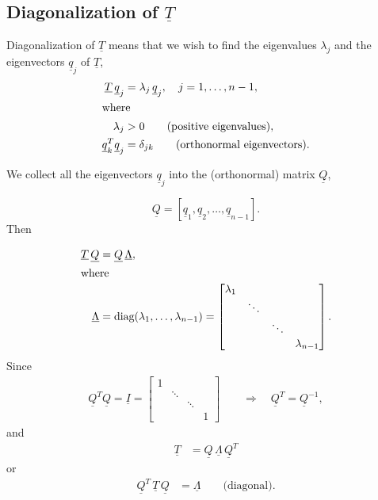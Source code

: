 \documentclass[11pt]{article}
\begin{document}
\subsection{Diagonalization of $\underline{T}$}

Diagonalization of $\underline{T}$ means that we wish to find the 
eigenvalues $\lambda_j$ and the eigenvectors $\underline{q}_j$ 
of $\underline{T}$, 
\begin{align*}
  \underline{T}\, \underline{q}_j &= \lambda_j \,\underline{q}_j, \quad j=1,\ldots,n-1 ,\\
  \intertext{where}
  \lambda_j &> 0 \qquad \text{(positive eigenvalues)}, \\
  \underline{q}_k^T \underline{q}_j &= \delta_{jk} \qquad \text{(orthonormal eigenvectors)}.
\end{align*}

We collect all the eigenvectors $\underline{q}_j$ into the (orthonormal) 
matrix $\underline{Q}$,

\begin{equation*}
  \underline{Q} = [\underline{q}_1, \underline{q}_2,\ldots,\underline{q}_{n-1}].
\end{equation*}
Then

\begin{align*}
  \underline{T} \, \underline{Q} &= \underline{Q} \, \underline{\Lambda}, \\
  \intertext{where}
  \underline{\Lambda} &= \text{diag}(\lambda_1, \ldots, \lambda_{n-1}) = 
  \begin{bmatrix}
    \lambda_1 & & & \\
     & \ddots & & \\
    & & \ddots & \\
    & & & \lambda_{n-1}
  \end{bmatrix}. 
\end{align*}
Since
\begin{align*}
  \underline{Q}^T \underline{Q} = \underline{I} = 
  \begin{bmatrix}
    1 & & & \\
     & \ddots & & \\
    & & \ddots & \\
    & & & 1
  \end{bmatrix} \qquad
  \Rightarrow \quad \underline{Q}^T = \underline{Q}^{-1} ,
\end{align*}
and
\begin{align}
  \underline{T} &= \underline{Q} \,\underline{\Lambda} \,\underline{Q}^T 
  \label{eq:T_diag}
\end{align}
or 
\begin{align*}
  \underline{Q}^T\, \underline{T} \, \underline{Q} &= \underline{\Lambda} \qquad \text{(diagonal)}.
\end{align*}
\end{document}
